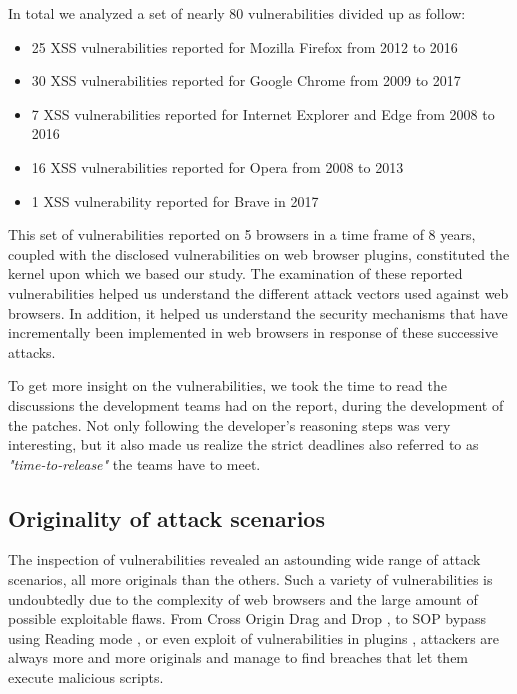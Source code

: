 \documentclass[journal]{IEEEtran}
\begin{document}
In total we analyzed a set of nearly 80 vulnerabilities divided up as follow:

\begin{itemize}
\item 25 XSS vulnerabilities reported for Mozilla Firefox from 2012 to 2016
\item 30 XSS vulnerabilities reported for Google Chrome from 2009 to 2017
\item 7 XSS vulnerabilities reported for Internet Explorer and Edge from 2008 to 2016
\item 16 XSS vulnerabilities reported for Opera from 2008 to 2013
\item 1 XSS vulnerability reported for Brave in 2017
\end{itemize}

This set of vulnerabilities reported on 5 browsers in a time frame of 8 years, coupled with the disclosed vulnerabilities on web browser plugins, constituted the kernel upon which we based our study. The examination of these reported vulnerabilities helped us understand the different attack vectors used against web browsers. In addition, it helped us understand the security mechanisms that have incrementally been implemented in web browsers in response of these successive attacks.

\medskip

To get more insight on the vulnerabilities, we took the time to read the discussions the development teams had on the report, during the development of the patches. Not only following the developer's reasoning steps was very interesting, but it also made us realize the strict deadlines also referred to as \emph{"time-to-release"} the teams have to meet.


\subsection{Originality of attack scenarios}

The inspection of vulnerabilities revealed an astounding wide range of attack scenarios, all more originals than the others. Such a variety of vulnerabilities is undoubtedly due to the complexity of web browsers and the large amount of possible exploitable flaws. From Cross Origin Drag and Drop \cite{CVE-2013-2849}, to SOP bypass using Reading mode \cite{edgeReadingModeUXSS}, or even exploit of vulnerabilities in plugins \cite{uxssPDF} \cite{uxssKeybase}, attackers are always more and more originals and manage to find breaches that let them execute malicious scripts.
\end{document}
